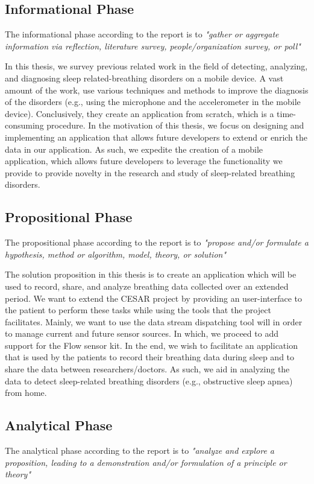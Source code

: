 \subsection{Informational Phase}
The informational phase according to the report is to \textit{"gather or aggregate information via reflection, literature survey, people/organization survey, or poll"}

In this thesis, we survey previous related work in the field of detecting, analyzing, and diagnosing sleep related-breathing disorders on a mobile device. A vast amount of the work, use various techniques and methods to improve the diagnosis of the disorders (e.g., using the microphone and the accelerometer in the mobile device). Conclusively, they create an application from scratch, which is a time-consuming procedure.  In the motivation of this thesis, we focus on designing and implementing an application that allows future developers to extend or enrich the data in our application. As such, we expedite the creation of a mobile application, which allows future developers to leverage the functionality we provide to provide novelty in the research and study of sleep-related breathing disorders.

\subsection{Propositional Phase}
The propositional phase according to the report is to \textit{"propose and/or formulate a hypothesis, method or algorithm, model, theory, or solution"}

The solution proposition in this thesis is to create an application which will be used to record, share, and analyze breathing data collected over an extended period. We want to extend the CESAR project by providing an user-interface to the patient to perform these tasks while using the tools that the project facilitates. Mainly, we want to use the data stream dispatching tool will in order to manage current and future sensor sources. In which, we proceed to add support for the Flow sensor kit. In the end, we wish to facilitate an application that is used by the patients to record their breathing data during sleep and to share the data between researchers/doctors. As such, we aid in analyzing the data to detect sleep-related breathing disorders (e.g., obstructive sleep apnea) from home. 

\subsection{Analytical Phase}
The analytical phase according to the report is to \textit{"analyze and explore a proposition, leading to a demonstration and/or formulation of a principle or theory"}


